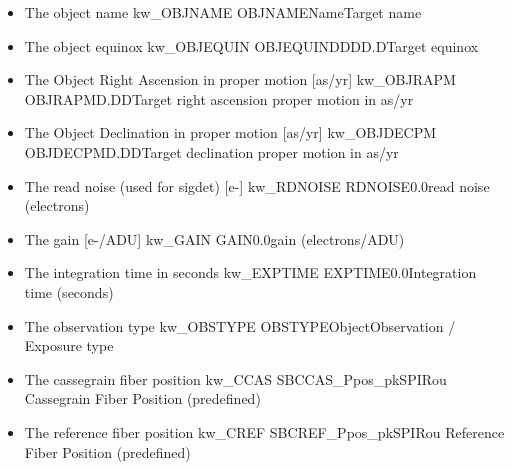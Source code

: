 \begin{itemize}
\item {}
{The object name}
{kw\_OBJNAME}
{OBJNAME}{Name}{Target name}
{\AllRecipes}{\spirouKeywords}{\spirouKeywords}

\item {}
{The object equinox}
{kw\_OBJEQUIN}
{OBJEQUIN}{DDDD.D}{Target equinox}
{\AllRecipes}{\spirouKeywords}{\spirouKeywords}

\item {}
{The Object Right Ascension in proper motion [as/yr]}
{kw\_OBJRAPM}
{OBJRAPM}{D.DD}{Target right ascension proper motion in as/yr}
{\AllRecipes}{\spirouKeywords}{\spirouKeywords}

\item {}
{The Object Declination in proper motion [as/yr]}
{kw\_OBJDECPM}
{OBJDECPM}{D.DD}{Target declination proper motion in as/yr}
{\AllRecipes}{\spirouKeywords}{\spirouKeywords}

\item {} 
{The read noise (used for sigdet) [e-]}
{kw\_RDNOISE}
{RDNOISE}{0.0}{read noise (electrons)}
{\AllRecipes}{\spirouKeywords}{\spirouKeywords}

\item {} 
{The gain [e-/ADU]}
{kw\_GAIN}
{GAIN}{0.0}{gain (electrons/ADU)}
{\AllRecipes}{\spirouKeywords}{\spirouKeywords}

\item {} 
{The integration time in seconds}
{kw\_EXPTIME}
{EXPTIME}{0.0}{Integration time (seconds)}
{\AllRecipes}{\spirouKeywords}{\spirouKeywords}

\item {}
{The observation type}
{kw\_OBSTYPE}
{OBSTYPE}{Object}{Observation / Exposure type}
{\AllRecipes}{\spirouKeywords}{\spirouKeywords}

\item {}
{The cassegrain fiber position}
{kw\_CCAS}
{SBCCAS\_P}{pos\_pk}{SPIRou Cassegrain Fiber Position (predefined)}
{\AllRecipes}{\spirouKeywords}{\spirouKeywords}

\item {}
{The reference fiber position}
{kw\_CREF}
{SBCREF\_P}{pos\_pk}{SPIRou Reference Fiber Position (predefined)}
{\AllRecipes}{\spirouKeywords}{\spirouKeywords}


\end{itemize}
